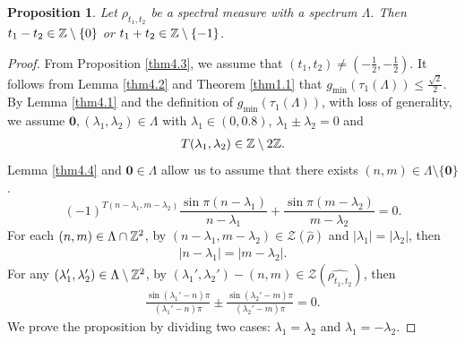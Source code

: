\documentclass[12pt,psfig,reqno]{amsart}
\numberwithin{equation}{section}
\theoremstyle{plain}
\newtheorem{prop}[thm]{Proposition}
\begin{document}
\begin{prop}\label{thm4.5}
		Let $\rho_{t_1,t_2}$ be a spectral measure with a spectrum $\Lambda$. 
 Then $t_1-t_2\in\Bbb Z\setminus\{0\}$ or $t_1+t_2\in\Bbb Z\setminus\{-1\}$. 
\end{prop}
\begin{proof}
	From Proposition \ref{thm4.3}, we assume that $(t_1,t_2)\neq(-\frac12,-\frac12)$.
It follows from Lemma \ref{thm4.2} and Theorem \ref{thm1.1} that 
$g_{\min}(\tau_1(\Lambda))\leq \frac{\sqrt{2}}{2}$. 
By Lemma \ref{thm4.1} and the definition of $g_{\min}(\tau_1(\Lambda))$, with loss of generality, we assume $\mathbf{0},(\lambda_1,\lambda_2)\in\Lambda$ with $\lambda_1\in(0,0.8)$,  $\lambda_1\pm\lambda_2=0$ and 
\begin{align}\label{(4.3)}
	T(\lambda_1,\lambda_2)\in\Bbb Z\setminus2\Bbb Z.
\end{align} 
Lemma \ref{thm4.4} and $\mathbf{0}\in\Lambda$ allow us to assume that there exists $(n,m)\in\Lambda\setminus\{\mathbf{0}\}$. 
$$
	(-1)^{T(n-\lambda_1,m-\lambda_2)}\frac{\sin\pi(n-\lambda_1)}{n-\lambda_1}+	\frac{\sin\pi(m-\lambda_2)}{m-\lambda_2}=0.
$$
For each $(n,m)\in\Lambda\cap\Bbb Z^2$, by $(n-\lambda_1,m-\lambda_2)\in\mathcal{Z}(\widehat{\rho})$ and $|\lambda_1|=|\lambda_2|$, then 
\begin{align}\label{(4.4)}
|n-\lambda_1|=|m-\lambda_2|.
\end{align}
For any $(\lambda_1',\lambda_2')\in\Lambda\setminus\Bbb Z^2$, by $(\lambda_1',\lambda_2')-(n,m)\in\mathcal{Z}(\widehat{\rho_{t_1,t_2}})$, then 
\begin{align}\label{(4.5)}
\frac{\sin(\lambda_1'-n)\pi}{(\lambda_1'-n)\pi}\pm \frac{\sin(\lambda_2'-m)\pi}{(\lambda_2'-m)\pi}=0.
\end{align}
We prove the proposition by dividing two cases: $\lambda_1=\lambda_2$ and $\lambda_1=-\lambda_2$.


\end{proof}
\end{document}

